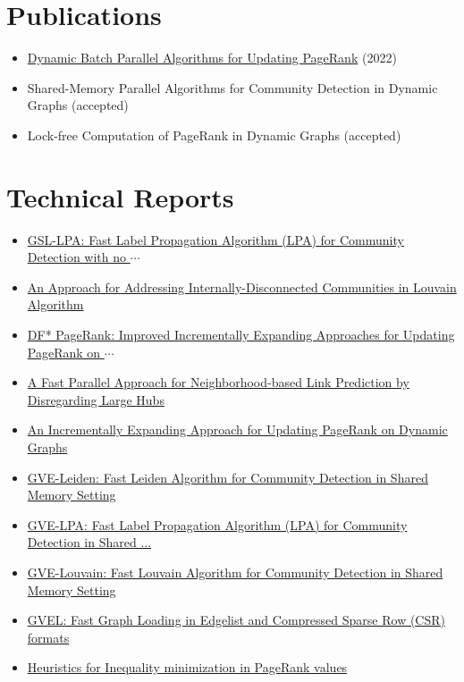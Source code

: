 \section*{Publications}

\begin{itemize}[noitemsep, leftmargin=*]
  \item \href{https://ieeexplore.ieee.org/abstract/document/9835216/}{Dynamic Batch Parallel Algorithms for Updating PageRank} (2022)
  \item Shared-Memory Parallel Algorithms for Community Detection in Dynamic Graphs (accepted)
  \item Lock-free Computation of PageRank in Dynamic Graphs (accepted)
\end{itemize}




\section*{Technical Reports}

\begin{itemize}[noitemsep, leftmargin=*]
  \item \href{https://arxiv.org/abs/2403.01261}{GSL-LPA: Fast Label Propagation Algorithm (LPA) for Community Detection with no $\cdots$}
  \item \href{https://arxiv.org/abs/2402.11454}{An Approach for Addressing Internally-Disconnected Communities in Louvain Algorithm}
  \item \href{https://arxiv.org/abs/2401.15870}{DF* PageRank: Improved Incrementally Expanding Approaches for Updating PageRank on $\cdots$}
  \item \href{https://arxiv.org/abs/2401.11415}{A Fast Parallel Approach for Neighborhood-based Link Prediction by Disregarding Large Hubs}
  \item \href{https://arxiv.org/abs/2401.03256}{An Incrementally Expanding Approach for Updating PageRank on Dynamic Graphs}
  \item \href{https://arxiv.org/abs/2312.13936}{GVE-Leiden: Fast Leiden Algorithm for Community Detection in Shared Memory Setting}
  \item \href{https://arxiv.org/abs/2312.08140}{GVE-LPA: Fast Label Propagation Algorithm (LPA) for Community Detection in Shared ...}
  \item \href{https://arxiv.org/abs/2312.04876}{GVE-Louvain: Fast Louvain Algorithm for Community Detection in Shared Memory Setting}
  \item \href{https://arxiv.org/abs/2311.14650}{GVEL: Fast Graph Loading in Edgelist and Compressed Sparse Row (CSR) formats}
  \item \href{https://arxiv.org/abs/2310.18537}{Heuristics for Inequality minimization in PageRank values}
\end{itemize}




